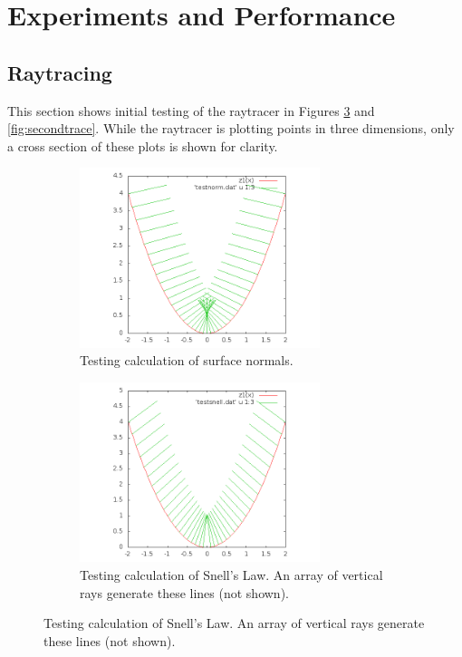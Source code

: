 \section{Experiments and Performance}
\label{experiments}

\subsection{Raytracing}

This section shows initial testing of the raytracer in Figures \ref{fig:firsttrace} and \ref{fig:secondtrace}. While the raytracer is plotting points in three dimensions, only a cross section of these plots is shown for clarity.

\begin{figure}
\centering
\begin{subfigure}{.5\textwidth}
  \centering
  \includegraphics[width=7cm]{out.png}
  \caption{Testing calculation of surface normals.}
  \label{fig:sub1}
\end{subfigure}%
\begin{subfigure}{.5\textwidth}
  \centering
  \includegraphics[width=7cm]{out2.png}
  \caption{Testing calculation of Snell's Law. An array of vertical rays generate these lines (not shown).}
  \label{fig:sub2}
\end{subfigure}
\label{fig:firsttrace}
\end{figure}

